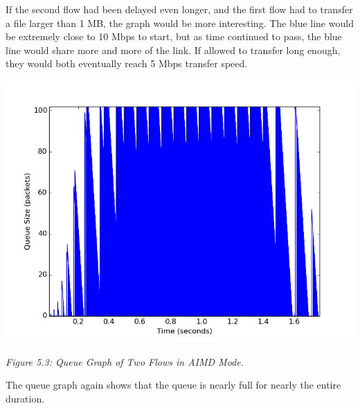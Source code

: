 \documentclass[11pt]{article}
\begin{document}
If the second flow had been delayed even longer, and the first flow had to transfer a file larger than 1 MB, the graph would be more interesting. The blue line would be extremely close to 10 Mbps to start, but as time continued to pass, the blue line would share more and more of the link. If allowed to transfer long enough, they would both eventually reach 5 Mbps transfer speed.


\includegraphics[width=17cm]{outputs/AIMD/AIMD_queue.png}

\centerline{\emph{Figure 5.3: Queue Graph of Two Flows in AIMD Mode.}}

The queue graph again shows that the queue is nearly full for nearly the entire duration.





\end{document}
